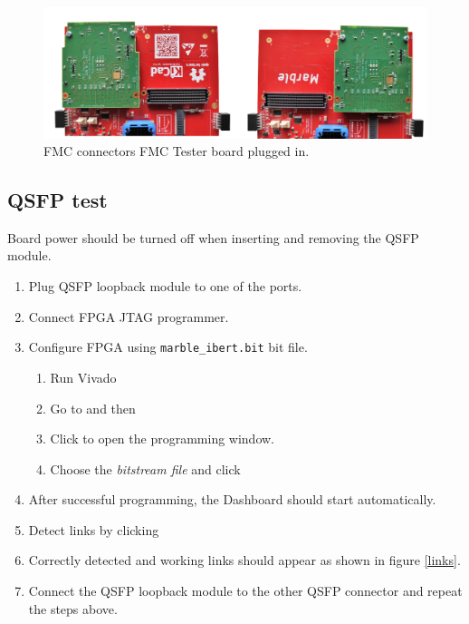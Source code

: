 \documentclass[12pt,oneside,a4]{article}
\begin{document}
\begin{figure}[H]
\begin{center}
\includegraphics[width=0.9\linewidth]{fmc_tester.png}
  \caption{FMC connectors FMC Tester board plugged in.}\label{fig:FMC_tester}
\end{center}
\end{figure}

\subsection{QSFP test}

\begin{leftbar}
Board power should be turned off when inserting and removing the QSFP module.
\end{leftbar}
\begin{enumerate}
	\item Plug QSFP loopback module to one of the ports.
	\item Connect FPGA JTAG programmer.
	\item Configure FPGA using \texttt{marble\_ibert.bit} bit file.
	\begin{enumerate}
		\item Run Vivado
		\item Go to  and then  
		\item Click  to open the programming window.
		\item Choose the \textit{bitstream file} and click 
	\end{enumerate}
	\item After successful programming, the Dashboard should start automatically.
	\item Detect links by clicking 
	\item Correctly detected and working links should appear as shown in figure \ref{links}.
	\item Connect the QSFP loopback module to the other QSFP connector and repeat the steps above.
\end{enumerate}
\end{document}

